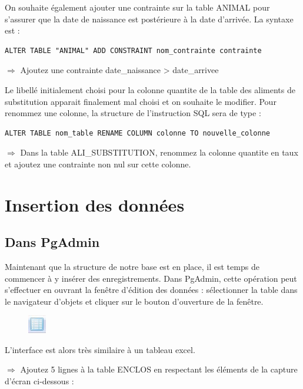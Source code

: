 \documentclass[11pt]{article}
\newcommand{\action}{$\Rightarrow$ }
\begin{document}
On souhaite également ajouter une contrainte sur la table ANIMAL pour s'assurer que la date de naissance est postérieure à la date d'arrivée. La syntaxe est :
\begin{lstlisting}
ALTER TABLE "ANIMAL" ADD CONSTRAINT nom_contrainte contrainte
\end{lstlisting}

\action Ajoutez une contrainte date\_naissance > date\_arrivee

Le libellé initialement choisi pour la colonne quantite de la table des aliments de substitution apparait finalement mal choisi et on souhaite le modifier. Pour renommez une colonne, la structure de l'instruction SQL sera de type :
\begin{lstlisting}
ALTER TABLE nom_table RENAME COLUMN colonne TO nouvelle_colonne
\end{lstlisting}

\action Dans la table ALI\_SUBSTITUTION, renommez la colonne quantite en taux et ajoutez une contrainte non nul sur cette colonne.

				
\section{Insertion des données}
\subsection{Dans PgAdmin}
Maintenant que la structure de notre base est en place, il est temps de commencer à y insérer des enregistrements. Dans PgAdmin, cette opération peut s'effectuer en ouvrant la fenêtre d'édition des données : sélectionner la table dans le navigateur d'objets et cliquer sur le bouton d'ouverture de la fenêtre.

\begin{figure}[H]
	\center \includegraphics[width=0.07\textwidth]{img/pgadmin_bouton_edition_donnees.jpg}\\[1em]
\end{figure}

L'interface est alors très similaire à un tableau excel. 

\action Ajoutez 5 lignes à la table ENCLOS en respectant les éléments de la capture d'écran ci-dessous :
\end{document}
